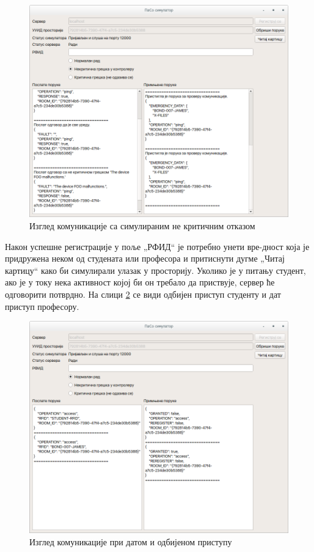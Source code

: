 \documentclass[a4paper, 12pt, diplomski]{etfcyr}
\def\quote#1{„#1“}
\begin{document}
\begin{justify}
\begin{figure}[H]
\begin{center}
						\includegraphics[width=1.0\textwidth]{manual/simulator_failure.png}
					\end{center}
					\caption{Изглед комуникације са симулираним не критичним отказом}
					\label{figure:simulator_failure}
				\end{figure}

				Након успешне регистрације у поље \quote{РФИД} је потребно унети вре-дност која је придружена неком од студената или професора и притиснути дугме \quote{Читај картицу} како би симулирали улазак у просторију. Уколико је у питању студент, ако је у току нека активност којој би он требало да приствује, сервер ће одговорити потврдно. На слици \ref{figure:simulator_read} се види одбијен приступ студенту и дат приступ професору.
				\begin{figure}[H]
					\begin{center}
						\includegraphics[width=1.0\textwidth]{manual/simulator_card_read.png}
					\end{center}
					\caption{Изглед комуникације при датом и одбијеном приступу}
					\label{figure:simulator_read}
				\end{figure}


\end{justify}
\end{document}
